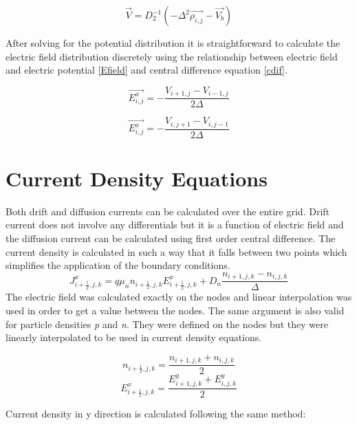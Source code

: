 \begin{doublespace}
\begin{equation}
\vec{V}=D_{2}^{-1}(-\Delta^2\vec{\rho_{i,j}}-\vec{V_b})
\end{equation}

After solving for the potential distribution it is straightforward to calculate the electric field distribution discretely using the relationship between electric field and electric potential \eqref{Efield} and central difference equation \eqref{cdif}. 

\begin{equation}
\vec{E^x_{i,j}}=-\frac{V_{i+1,j}-V_{i-1,j}}{2\Delta}
\end{equation}

\begin{equation}
\vec{E^x_{i,j}}=-\frac{V_{i,j+1}-V_{i,j-1}}{2\Delta}
\end{equation}

\clearpage
\section{Current Density Equations}
 Both drift and diffusion currents can be calculated over the entire grid. Drift current does not involve any differentials but it is a function of electric field and the diffusion current can be calculated using first order central difference. The current density is calculated in such a way that it falls between two points which simplifies the application of the boundary conditions.
\begin{equation}
J^x_{i+\frac{1}{2},j,k}=q\mu_n n_{i+\frac{1}{2},j,k} E^x_{i+\frac{1}{2},j,k}+D_n \frac{n_{i+1,j,k}-n_{i,j,k}}{\Delta}
\end{equation}
The electric field was calculated exactly on the nodes and linear interpolation was used in order to get a value between the nodes. The same argument is also valid for particle densities \textit{p} and \textit{n}. They were defined on the nodes but they were linearly interpolated to be used in current density equations.

\begin{equation}\nonumber
n_{i+\frac{1}{2},j,k}=\frac{n_{i+1,j,k}+n_{i,j,k}}{2}
\end{equation}
\begin{equation}\nonumber
E^{x}_{i+\frac{1}{2},j,k}=\frac{E^y_{i+1,j,k}+E^y_{i,j,k}}{2}
\end{equation}

Current density in y direction is calculated following the same method:


\end{doublespace}
